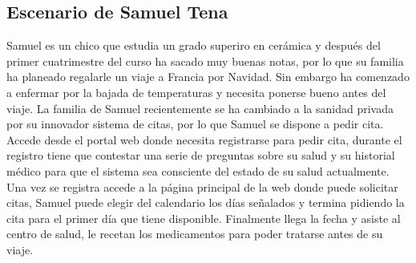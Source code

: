 \subsection{Escenario de Samuel Tena} 
    Samuel es un chico que estudia un grado superiro en cerámica y después del primer
    cuatrimestre del curso ha sacado muy buenas notas, por lo que su familia ha planeado
    regalarle un viaje a Francia por Navidad. Sin embargo ha comenzado a enfermar por la bajada
    de temperaturas y necesita ponerse bueno antes del viaje. La familia de Samuel recientemente
    se ha cambiado a la sanidad privada por su innovador sistema de citas, por lo que Samuel se
    dispone a pedir cita. Accede desde el portal web donde necesita registrarse para pedir cita,
    durante el registro tiene que contestar una serie de preguntas sobre su salud y su historial
    médico para que el sistema sea consciente del estado de su salud actualmente.
    Una vez se registra accede a la página principal de la web donde puede solicitar citas, Samuel
    puede elegir del calendario los días señalados y termina pidiendo la cita para el primer día que
    tiene disponible. Finalmente llega la fecha y asiste al centro de salud, le recetan los
    medicamentos para poder tratarse antes de su viaje.
